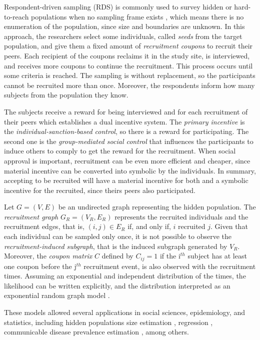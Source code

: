 Respondent-driven sampling (RDS) is commonly used to survey hidden or hard-to-reach populations when
no sampling frame exists \cite[]{heckathorn1997}, which means there is no
enumeration of the population, since size and boundaries are unknown. In this approach, the
researchers select some individuals, called {\em seeds} from the target
population, and give them a fixed amount of {\em recruitment coupons} to
recruit their peers. Each recipient of the coupons reclaims it in the study
site, is interviewed, and receives more coupons to continue the recruitment.
This process occurs until some criteria is reached. The sampling is without
replacement, so the participants cannot be recruited more than once. Moreover,
the respondents inform how many subjects from the population they know.

The subjects receive a reward for being interviewed and for each recruitment
of their peers which establishes a dual incentive system. The {\em primary incentive} is the
{\em individual-sanction-based control}, so there is a reward for
participating. The second one is the {\em group-mediated social control} that
influences the participants to induce others to comply to get the reward for the recruitment. When social approval is important, recruitment can be even
more efficient and cheaper, since material incentive can be converted into
symbolic by the individuals. In summary, accepting to be recruited will have a
material incentive for both and a symbolic incentive for the recruited, since
theirs peers also participated.

Let $G = (V,E)$ be an undirected graph representing the hidden population. The {\em recruitment graph} $G_R =
(V_R, E_R)$ represents the recruited individuals and the recruitment edges,
that is, $(i,j) \in E_R$ if, and only if, $i$ recruited $j$.
Given that each individual can be sampled only once, it is not possible to
observe the {\em recruitment-induced subgraph}, that is the induced subgraph
generated by $V_R$. Moreover, the {\em coupon matrix} $C$ defined by $C_{ij} =
1$ if the i$^{th}$ subject has at least one coupon before the j$^{th}$
recruitment event, is also observed with the recruitment times. Assuming an
exponential and independent distribution of the times, the likelihood can be
written explicitly, and the distribution interpreted as an exponential random graph
model \cite[]{crawford2016}.  

These models allowed several applications in social sciences, epidemiology,
and statistics, including hidden populations size estimation
\cite[]{crawford2018hidden}, regression \cite[]{bastos2012binary}, communicable
disease prevalence estimation \cite[]{albuquerque2009avaliaccao}, among
others.

